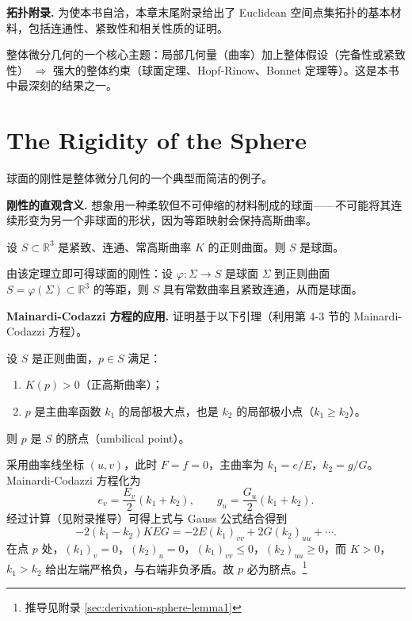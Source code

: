 \textbf{拓扑附录.} 为使本书自洽，本章末尾附录给出了 Euclidean 空间点集拓扑的基本材料，包括连通性、紧致性和相关性质的证明。

\begin{Remark}
整体微分几何的一个核心主题：局部几何量（曲率）加上整体假设（完备性或紧致性） $\Rightarrow$ 强大的整体约束（球面定理、Hopf-Rinow、Bonnet 定理等）。这是本书中最深刻的结果之一。
\end{Remark}

\section{The Rigidity of the Sphere}\label{sec:rigidity-sphere}

球面的刚性是整体微分几何的一个典型而简洁的例子。

\textbf{刚性的直观含义.} 想象用一种柔软但不可伸缩的材料制成的球面——不可能将其连续形变为另一个非球面的形状，因为等距映射会保持高斯曲率。

\begin{Theorem}[球面刚性]\label{sphere-rigidity}
设 $S \subset \mathbb{R}^3$ 是紧致、连通、常高斯曲率 $K$ 的正则曲面。则 $S$ 是球面。
\end{Theorem}

由该定理立即可得球面的刚性：设 $\varphi: \Sigma \to S$ 是球面 $\Sigma$ 到正则曲面 $S = \varphi(\Sigma) \subset \mathbb{R}^3$ 的等距，则 $S$ 具有常数曲率且紧致连通，从而是球面。

\textbf{Mainardi-Codazzi 方程的应用.} 证明基于以下引理（利用第 4-3 节的 Mainardi-Codazzi 方程）。

\begin{Lemma}\label{sphere-lemma1}
设 $S$ 是正则曲面，$p \in S$ 满足：
\begin{enumerate}
  \item $K(p) > 0$（正高斯曲率）；
  \item $p$ 是主曲率函数 $k_1$ 的局部极大点，也是 $k_2$ 的局部极小点（$k_1 \geq k_2$）。
\end{enumerate}
则 $p$ 是 $S$ 的脐点（umbilical point）。
\end{Lemma}

\begin{Proof}
采用曲率线坐标 $(u,v)$，此时 $F = f = 0$，主曲率为 $k_1 = e/E$，$k_2 = g/G$。Mainardi-Codazzi 方程化为
\[
e_v = \frac{E_v}{2}(k_1 + k_2),\qquad g_u = \frac{G_u}{2}(k_1 + k_2).
\]
经过计算（见附录推导）可得上式与 Gauss 公式结合得到
\[
-2(k_1 - k_2)KEG = -2E(k_1)_{vv} + 2G(k_2)_{uu} + \cdots.
\]
在点 $p$ 处，$(k_1)_v = 0$，$(k_2)_u = 0$，$(k_1)_{vv} \leq 0$，$(k_2)_{uu} \geq 0$，而 $K > 0$，$k_1 > k_2$ 给出左端严格负，与右端非负矛盾。故 $p$ 必为脐点。\footnote{推导见附录 \cref{sec:derivation-sphere-lemma1}}
\end{Proof}

